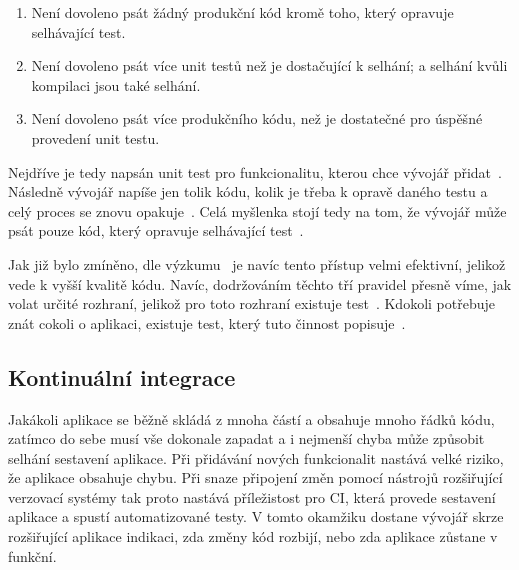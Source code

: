 \begin{enumerate}
    \item Není dovoleno psát žádný produkční kód kromě toho,
    který opravuje selhávající test.
    \item Není dovoleno psát více unit testů než je dostačující k selhání;
    a selhání kvůli kompilaci jsou také selhání.
    \item Není dovoleno psát více produkčního kódu,
    než je dostatečné pro úspěšné provedení unit testu.
\end{enumerate}

Nejdříve je tedy napsán unit test pro funkcionalitu,
kterou chce vývojář přidat~\cite{tdd}.
Následně vývojář napíše jen tolik kódu,
kolik je třeba k opravě daného testu a celý proces se znovu opakuje~\cite{tdd}.
Celá myšlenka stojí tedy na tom,
že vývojář může psát pouze kód,
který opravuje selhávající test~\cite{tdd}.
\emph{}~\cite{tdd}
 
Jak již bylo zmíněno,
dle výzkumu~\cite{testing_quality} je navíc tento přístup velmi efektivní,
jelikož vede k vyšší kvalitě kódu.
Navíc,
dodržováním těchto tří pravidel přesně víme,
jak volat určité rozhraní,
jelikož pro toto rozhraní existuje test~\cite{tdd}.
Kdokoli potřebuje znát cokoli o aplikaci,
existuje test,
který tuto činnost popisuje~\cite{tdd}.

\subsection{Kontinuální integrace}
\label{chap:ci}

Jakákoli aplikace se běžně skládá z mnoha částí
a obsahuje mnoho řádků kódu,
zatímco do sebe musí vše dokonale zapadat
a i nejmenší chyba může způsobit selhání sestavení aplikace.
Při přidávání nových funkcionalit nastává velké riziko,
že aplikace obsahuje chybu.
Při snaze připojení změn pomocí nástrojů rozšiřující verzovací systémy
tak proto nastává příležistost pro CI,
která provede sestavení aplikace a spustí automatizované testy.
V tomto okamžiku dostane vývojář skrze rozšiřující aplikace indikaci,
zda změny kód rozbijí,
nebo zda aplikace zůstane v funkční.~\cite{ci}

